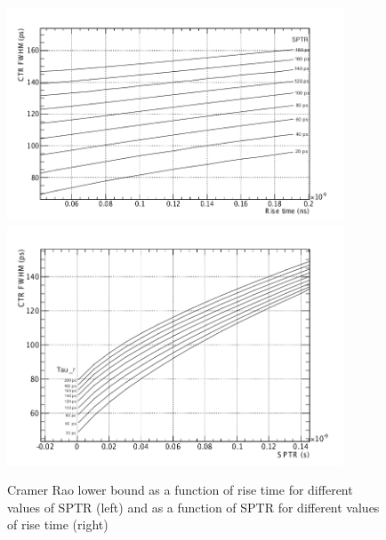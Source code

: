 \begin{figure}[htbp]
\begin{center}
\includegraphics[width=10cm]{../Pictures/Chapter_4/rise_CTR.png}
\includegraphics[width=10cm]{../Pictures/Chapter_4/sigma_CTR.png}
\end{center}
\caption[Cramer Rao evolution - rise time]{Cramer Rao lower bound as a function of rise time for different values of SPTR (left) and as a function of SPTR for different values of rise time (right)}
\label{fig:cramer_rise}
\end{figure}

